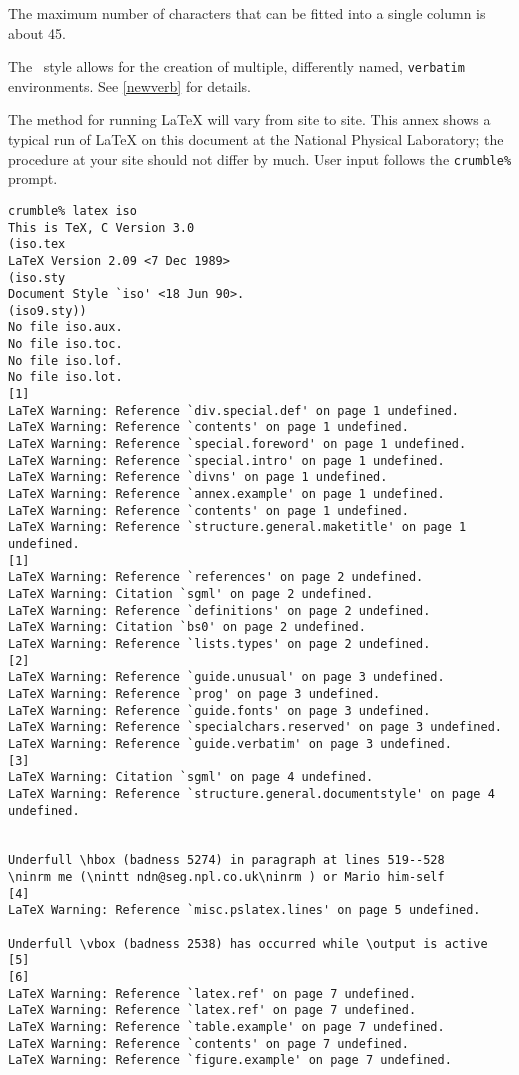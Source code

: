 The maximum number of characters that can be fitted into a single column
is about 45.

The \iso\ style allows for the creation of multiple, differently
named, \verb|verbatim| environments.
See \ref{newverb} for details.

\onecolumn
{}
\label{run}
The method for running LaTeX will vary from site to site.
This annex shows a typical run of LaTeX on this document at the National
Physical Laboratory; the procedure at your site should not differ by much.
User input follows the \verb|crumble%| prompt.

\begin{verbatim}
crumble% latex iso
This is TeX, C Version 3.0
(iso.tex
LaTeX Version 2.09 <7 Dec 1989>
(iso.sty
Document Style `iso' <18 Jun 90>.
(iso9.sty))
No file iso.aux.
No file iso.toc.
No file iso.lof.
No file iso.lot.
[1]
LaTeX Warning: Reference `div.special.def' on page 1 undefined.
LaTeX Warning: Reference `contents' on page 1 undefined.
LaTeX Warning: Reference `special.foreword' on page 1 undefined.
LaTeX Warning: Reference `special.intro' on page 1 undefined.
LaTeX Warning: Reference `divns' on page 1 undefined.
LaTeX Warning: Reference `annex.example' on page 1 undefined.
LaTeX Warning: Reference `contents' on page 1 undefined.
LaTeX Warning: Reference `structure.general.maketitle' on page 1 undefined.
[1]
LaTeX Warning: Reference `references' on page 2 undefined.
LaTeX Warning: Citation `sgml' on page 2 undefined.
LaTeX Warning: Reference `definitions' on page 2 undefined.
LaTeX Warning: Citation `bs0' on page 2 undefined.
LaTeX Warning: Reference `lists.types' on page 2 undefined.
[2]
LaTeX Warning: Reference `guide.unusual' on page 3 undefined.
LaTeX Warning: Reference `prog' on page 3 undefined.
LaTeX Warning: Reference `guide.fonts' on page 3 undefined.
LaTeX Warning: Reference `specialchars.reserved' on page 3 undefined.
LaTeX Warning: Reference `guide.verbatim' on page 3 undefined.
[3]
LaTeX Warning: Citation `sgml' on page 4 undefined.
LaTeX Warning: Reference `structure.general.documentstyle' on page 4 undefined.


Underfull \hbox (badness 5274) in paragraph at lines 519--528
\ninrm me (\nintt ndn@seg.npl.co.uk\ninrm ) or Mario him-self
[4]
LaTeX Warning: Reference `misc.pslatex.lines' on page 5 undefined.

Underfull \vbox (badness 2538) has occurred while \output is active [5]
[6]
LaTeX Warning: Reference `latex.ref' on page 7 undefined.
LaTeX Warning: Reference `latex.ref' on page 7 undefined.
LaTeX Warning: Reference `table.example' on page 7 undefined.
LaTeX Warning: Reference `contents' on page 7 undefined.
LaTeX Warning: Reference `figure.example' on page 7 undefined.


\end{verbatim}
